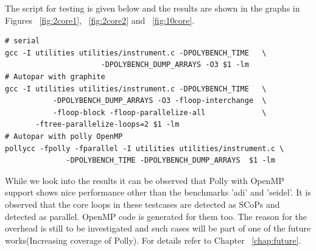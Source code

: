 The script for testing is given below and the results are shown in the graphs in
Figures ~\ref{fig:2core1}, ~\ref{fig:2core2} and ~\ref{fig:10core}.
{\footnotesize
\begin{lstlisting}
# serial
gcc -I utilities utilities/instrument.c -DPOLYBENCH_TIME   \
                      -DPOLYBENCH_DUMP_ARRAYS -O3 $1 -lm
# Autopar with graphite
gcc -I utilities utilities/instrument.c -DPOLYBENCH_TIME   \
           -DPOLYBENCH_DUMP_ARRAYS -O3 -floop-interchange  \
           -floop-block -floop-parallelize-all             \
	   -ftree-parallelize-loops=2 $1 -lm
# Autopar with polly OpenMP
pollycc -fpolly -fparallel -I utilities utilities/instrument.c \
              -DPOLYBENCH_TIME -DPOLYBENCH_DUMP_ARRAYS  $1 -lm
\end{lstlisting}
}
While we look into the results it can be observed that Polly with OpenMP support
shows nice performance other than the benchmarks 'adi' and 'seidel'. It is observed
that the core loops in these testcases are detected as SCoPs and detected as parallel. OpenMP
code is generated for them too. The reason for the overhead is still to be investigated and such cases will be part of one
of the future works(Increasing coverage of Polly). For details refer to Chapter ~\ref{chap:future}.



